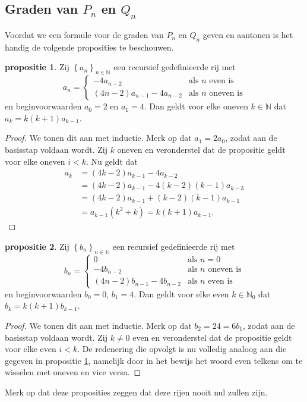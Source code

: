 \documentclass[12pt,a4paper]{article}
\theoremstyle{definition}
\numberwithin{equation}{section}
\begin{document}
\subsection*{Graden van $P_n$ en $Q_n$}
Voordat we een formule voor de graden van $P_n$ en $Q_n$ geven en aantonen is het handig de volgende proposities te beschouwen.
\newtheorem{propositie}{propositie}\label{thm:prop1}
\begin{propositie} Zij  $\left\{a_n\right\}_{n\in\mathbb{N}}$ een recursief gedefinieerde rij met
%
$$a_n=
\begin{cases}
  -4 a_{n-2} & \text{als $n$ even is}\\
  \left(4n-2\right)a_{n-1} - 4a_{n-2} & \text{als $n$ oneven is}
\end{cases}$$
en beginvoorwaarden $a_0=2$ en $a_1=4$. Dan geldt voor elke oneven $k\in\mathbb{N}$ dat $a_k = k(k+1)a_{k-1}$.
\end{propositie}
\begin{proof}
  We tonen dit aan met inductie. Merk op dat $a_1 = 2a_0$, zodat aan de basisstap voldaan wordt. 
  Zij $k$ oneven en veronderstel dat de propositie geldt voor elke oneven $i<k$.
  Nu geldt dat
  \begin{align*}
    a_k &= (4k-2)a_{k-1} - 4a_{k-2}\\
        &= (4k-2)a_{k-1} - 4(k-2)(k-1)a_{k-3}\\
        &= (4k-2)a_{k-1}+(k-2)(k-1)a_{k-1}\\
        &=a_{k-1}(k^2 + k) = k(k+1)a_{k-1}.
  \end{align*}
\end{proof}


\label{thm:prop2}
\begin{propositie} Zij $\left\{b_n\right\}_{n\in\mathbb{N}}$ een recursief gedefinieerde rij met
$$b_n=
\begin{cases}
 0 & \text{als $n=0$} \\
  -4 b_{n-2} & \text{als $n$ oneven is}\\
  \left(4n-2\right)b_{n-1} - 4b_{n-2} & \text{als $n$ even is}
\end{cases}$$
en beginvoorwaarden $b_0=0$, $b_1=4$. Dan geldt voor elke even $k\in\mathbb{N}_0$ dat $b_k = k(k+1)b_{k-1}$.
\end{propositie}
\begin{proof}
  We tonen dit aan met inductie. Merk op dat $b_2 =24= 6b_1$, zodat aan de basisstap voldaan wordt.  
  Zij $k\neq 0$ even en veronderstel dat de propositie geldt voor elke even $i<k$. De redenering die opvolgt is nu volledig analoog aan die gegeven in propositie \hyperref[thm:prop1]{1}, namelijk door in het bewijs het woord even telkens om te wisselen met oneven en vice versa.
\end{proof}
Merk op dat deze proposities zeggen dat deze rijen nooit nul zullen zijn.
\end{document}
